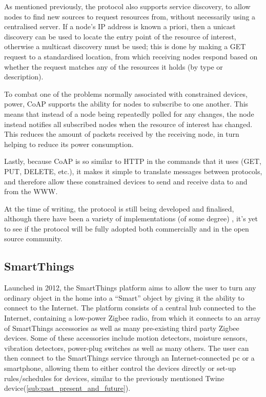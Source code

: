 As mentioned previously, the protocol also supports service discovery, to allow nodes to find new sources to request resources from, without necessarily using a centralised server. If a node's IP address is known a priori, then a unicast discovery can be used to locate the entry point of the resource of interest, otherwise a multicast discovery must be used; this is done by making a GET request to a standardised location, from which receiving nodes respond based on whether the request matches any of the resources it holds (by type or description).\cite{IETF_CORE}

To combat one of the problems normally associated with constrained devices, power, CoAP supports the ability for nodes to subscribe to one another. This means that instead of a node being repeatedly polled for any changes, the node instead notifies all subscribed nodes when the resource of interest has changed. This reduces the amount of packets received by the receiving node, in turn helping to reduce its power consumption.

Lastly, because CoAP is so similar to HTTP in the commands that it uses (GET, PUT, DELETE, etc.), it makes it simple to translate messages between protocols, and therefore allow these constrained devices to send and receive data to and from the WWW.\cite{IETF_COAP_HTTP} 

At the time of writing, the protocol is still being developed and finalised, although there have been a variety of implementations (of some degree) \cite{COAP_1}\cite{COAP_2}\cite{COAP_3}, it's yet to see if the protocol will be fully adopted both commercially and in the open source community.


\subsection{SmartThings} %
\label{sub:smart_things}
Launched in 2012, the SmartThings platform aims to allow the user to turn any ordinary object in the home into a ``Smart'' object by giving it the ability to connect to the Internet. The platform consists of a central hub connected to the Internet, containing a low-power Zigbee radio, from which it connects to an array of SmartThings accessories as well as many pre-existing third party Zigbee devices. Some of these accessories include motion detectors, moisture sensors, vibration detectors, power-plug switches as well as many others. The user can then connect to the SmartThings service through an Internet-connected pc or a smartphone, allowing them to either control the devices directly or set-up rules/schedules for devices, similar to the previously mentioned Twine device(\ref{sub:past_present_and_future}). 


